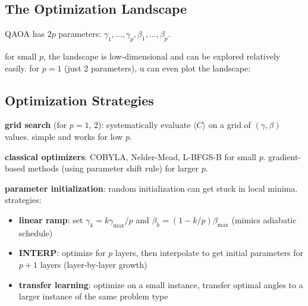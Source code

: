 \documentclass[11pt,a4paper]{article}
\theoremstyle{definition}
\theoremstyle{remark}
\begin{document}
\subsection{The Optimization Landscape}

QAOA has $2p$ parameters: $\gamma_1, \ldots, \gamma_p, \beta_1, \ldots, \beta_p$.

for small $p$, the landscape is low-dimensional and can be explored relatively easily. for $p = 1$ (just 2 parameters), u can even plot the landscape:

\begin{center}
\end{center}

\subsection{Optimization Strategies}

\textbf{grid search} (for $p = 1$, 2): systematically evaluate $\langle C \rangle$ on a grid of $(\gamma, \beta)$ values. simple and works for low $p$.

\textbf{classical optimizers}: COBYLA, Nelder-Mead, L-BFGS-B for small $p$. gradient-based methods (using parameter shift rule) for larger $p$.

\textbf{parameter initialization}: random initialization can get stuck in local minima. strategies:
\begin{itemize}
    \item \textbf{linear ramp}: set $\gamma_k = k \gamma_{\max}/p$ and $\beta_k = (1 - k/p) \beta_{\max}$ (mimics adiabatic schedule)
    \item \textbf{INTERP}: optimize for $p$ layers, then interpolate to get initial parameters for $p+1$ layers (layer-by-layer growth)
    \item \textbf{transfer learning}: optimize on a small instance, transfer optimal angles to a larger instance of the same problem type
\end{itemize}
\end{document}
